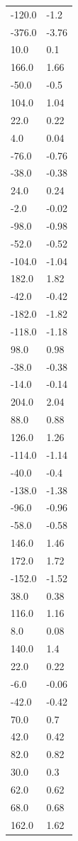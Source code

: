 \begin{longtable}{ll}
-120.0 & -1.2 \\
-376.0 & -3.76 \\
10.0 & 0.1 \\
166.0 & 1.66 \\
-50.0 & -0.5 \\
104.0 & 1.04 \\
22.0 & 0.22 \\
4.0 & 0.04 \\
-76.0 & -0.76 \\
-38.0 & -0.38 \\
24.0 & 0.24 \\
-2.0 & -0.02 \\
-98.0 & -0.98 \\
-52.0 & -0.52 \\
-104.0 & -1.04 \\
182.0 & 1.82 \\
-42.0 & -0.42 \\
-182.0 & -1.82 \\
-118.0 & -1.18 \\
98.0 & 0.98 \\
-38.0 & -0.38 \\
-14.0 & -0.14 \\
204.0 & 2.04 \\
88.0 & 0.88 \\
126.0 & 1.26 \\
-114.0 & -1.14 \\
-40.0 & -0.4 \\
-138.0 & -1.38 \\
-96.0 & -0.96 \\
-58.0 & -0.58 \\
146.0 & 1.46 \\
172.0 & 1.72 \\
-152.0 & -1.52 \\
38.0 & 0.38 \\
116.0 & 1.16 \\
8.0 & 0.08 \\
140.0 & 1.4 \\
22.0 & 0.22 \\
-6.0 & -0.06 \\
-42.0 & -0.42 \\
70.0 & 0.7 \\
42.0 & 0.42 \\
82.0 & 0.82 \\
30.0 & 0.3 \\
62.0 & 0.62 \\
68.0 & 0.68 \\
162.0 & 1.62 \\

\end{longtable}
